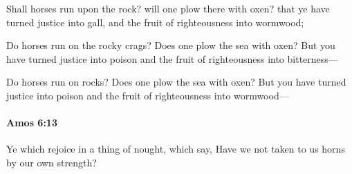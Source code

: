 			\begin{versebox}
					\item[BHS] 
					\item[LXX] 
					\item[ASV] Shall horses run upon the rock? will one plow there with oxen? that ye have turned justice into gall, and the fruit of righteousness into wormwood;
					\item[NIV] Do horses run on the rocky crags? Does one plow the sea with oxen? But you have turned justice into poison and the fruit of righteousness into bitterness—
					\item[NRSV] Do horses run on rocks? Does one plow the sea with oxen? But you have turned justice into poison and the fruit of righteousness into wormwood—
			\end{versebox}

		\paragraph{Amos 6:13} %
			\label{AMOS-6-13}

			Ye which rejoice in a thing of nought, which say, Have we not taken to us horns by our own strength?

